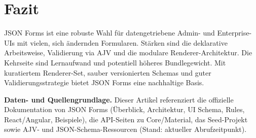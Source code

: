 \documentclass[11pt,a4paper]{article}
\begin{document}
\section{Fazit}
JSON Forms ist eine robuste Wahl f\"ur datengetriebene Admin- und Enterprise-UIs mit vielen, sich \"andernden Formularen. St\"arken sind die deklarative Arbeitsweise, Validierung via AJV und die modulare Renderer-Architektur. Die Kehrseite sind Lernaufwand und potentiell h\"oheres Bundlegewicht. Mit kuratiertem Renderer-Set, sauber versionierten Schemas und guter Validierungsstrategie bietet JSON Forms eine nachhaltige Basis.

\vspace{1em}
\noindent\textbf{Daten- und Quellengrundlage.} Dieser Artikel referenziert die offizielle Dokumentation von JSON Forms (\"Uberblick, Architektur, UI Schema, Rules, React/Angular, Beispiele), die API-Seiten zu Core/Material, das Seed-Projekt sowie AJV- und JSON-Schema-Ressourcen (Stand: aktueller Abrufzeitpunkt).
\end{document}
